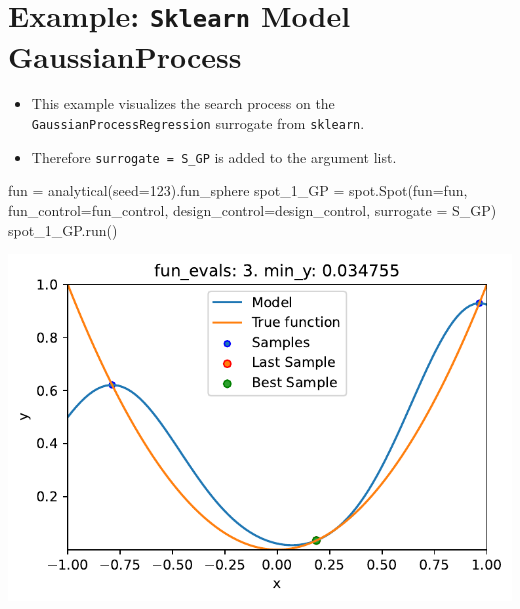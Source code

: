 \documentclass[
  letterpaper,
  DIV=11,
  numbers=noendperiod]{scrreprt}
\newenvironment{Shaded}{\begin{snugshade}}{\end{snugshade}}
\newcommand{\DecValTok}[1]{\textcolor[rgb]{0.68,0.00,0.00}{#1}}
\newcommand{\NormalTok}[1]{\textcolor[rgb]{0.00,0.23,0.31}{#1}}
\newcommand{\OperatorTok}[1]{\textcolor[rgb]{0.37,0.37,0.37}{#1}}
\providecommand{\tightlist}{%
  \setlength{\itemsep}{0pt}\setlength{\parskip}{0pt}}\usepackage{longtable,booktabs,array}
\begin{document}
\section{\texorpdfstring{Example: \texttt{Sklearn} Model
GaussianProcess}{Example: Sklearn Model GaussianProcess}}\label{example-sklearn-model-gaussianprocess}

\begin{itemize}
\tightlist
\item
  This example visualizes the search process on the
  \texttt{GaussianProcessRegression} surrogate from \texttt{sklearn}.
\item
  Therefore \texttt{surrogate\ =\ S\_GP} is added to the argument list.
\end{itemize}

\begin{Shaded}
\begin{Highlighting}[]
\NormalTok{fun }\OperatorTok{=}\NormalTok{ analytical(seed}\OperatorTok{=}\DecValTok{123}\NormalTok{).fun\_sphere}
\NormalTok{spot\_1\_GP }\OperatorTok{=}\NormalTok{ spot.Spot(fun}\OperatorTok{=}\NormalTok{fun,}
\NormalTok{                      fun\_control}\OperatorTok{=}\NormalTok{fun\_control,}
\NormalTok{                      design\_control}\OperatorTok{=}\NormalTok{design\_control,}
\NormalTok{                      surrogate }\OperatorTok{=}\NormalTok{ S\_GP)}
\NormalTok{spot\_1\_GP.run()}
\end{Highlighting}
\end{Shaded}

\includegraphics{010_num_spot_sklearn_surrogate_files/figure-pdf/cell-24-output-1.pdf}
\end{document}
